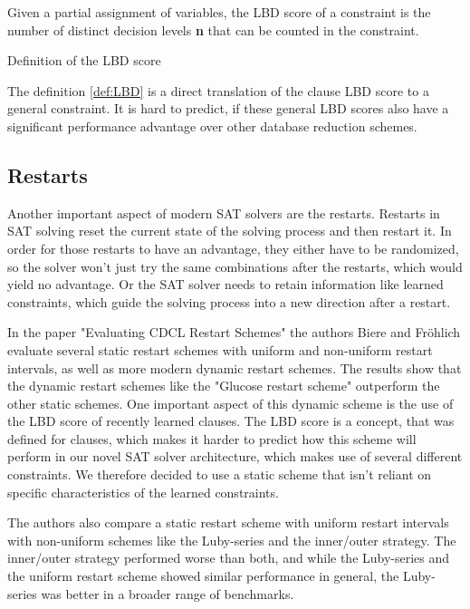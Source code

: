 \begin{definition}[!htb]
\begin{leftbar}
Given a partial assignment of variables, the LBD score of a constraint is the number of distinct decision levels \textbf{n} that can be counted in the constraint.
\end{leftbar}
\caption{Definition of the LBD score}
\label{def:LBD}
\end{definition}

The definition \ref{def:LBD} is a direct translation of the clause LBD score to a general constraint. It is hard to predict, if these general LBD scores also have a significant performance advantage over other database reduction schemes.

\subsection{Restarts}

Another important aspect of modern SAT solvers are the restarts. Restarts in SAT solving reset the current state of the solving process and then restart it. In order for those restarts to have an advantage, they either have to be randomized, so the solver won't just try the same combinations after the restarts, which would yield no advantage. Or the SAT solver needs to retain information like learned constraints, which guide the solving process into a new direction after a restart.
\cite{biere2009handbook}

In the paper "Evaluating CDCL Restart Schemes" \cite{biere2015evaluatingRestarts} the authors Biere and Fröhlich evaluate several static restart schemes with uniform and non-uniform restart intervals, as well as more modern dynamic restart schemes. The results show that the dynamic restart schemes like the "Glucose restart scheme" \cite{biere2015evaluatingRestarts} outperform the other static schemes. One important aspect of this dynamic scheme is the use of the LBD score of recently learned clauses. The LBD score is a concept, that was defined for clauses, which makes it harder to predict how this scheme will perform in our novel SAT solver architecture, which makes use of several different constraints. We therefore decided to use a static scheme that isn't reliant on specific characteristics of the learned constraints.

The authors also compare a static restart scheme with uniform restart intervals with non-uniform schemes like the Luby-series and the inner/outer strategy. The inner/outer strategy performed worse than both, and while the Luby-series and the uniform restart scheme showed similar performance in general, the Luby-series was better in a broader range of benchmarks. \cite{biere2015evaluatingRestarts}

